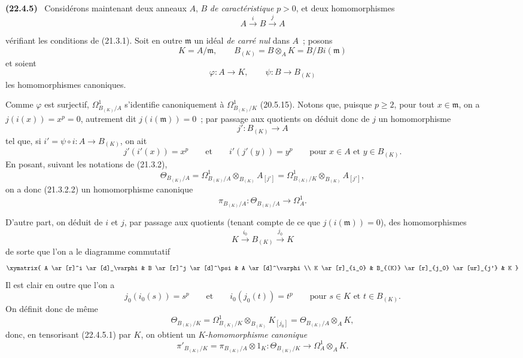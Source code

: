 \documentclass[10pt,oneside]{book}
\makeatletter
\newcommand{\setmanualcurrentlabel}[1]{\def\@currentlabel{#1}}
\newcommand{\oldpage}[2][]{%
  \setcounter{footnote}{0}%
  \marginpar{\scriptsize\textbf{#1}~|~#2}\ignorespaces}
\newenvironment{env}[1][]{\setmanualcurrentlabel{#1}\par\medskip\noindent\textbf{(#1)}\ }{\par}
\makeatother
\begin{document}
\begin{env}[22.4.5]
\label{0.22.4.5-fr}
Considérons maintenant deux anneaux $A$, $B$ \emph{de caractéristique} $p>0$, et
deux homomorphismes
\[
  A\xrightarrow{i}B\xrightarrow{j}A
\]

\oldpage[0\textsubscript{IV-1}]{197}

vérifiant les conditions de (21.3.1). Soit en outre $\mathfrak m$ un idéal
\emph{de carré nul} dans $A$~; posons
\[
  K=A/\mathfrak m,\qquad
  B_{(K)}=B\otimes_AK=B/Bi(\mathfrak m)
\]
et soient
\[
  \varphi:A\longrightarrow K,\qquad
  \psi:B\longrightarrow B_{(K)}
\]
les homomorphismes canoniques.

Comme $\varphi$ est surjectif, $\Omega^1_{B_{(K)}/A}$ s'identifie
canoniquement à $\Omega^1_{B_{(K)}/K}$ (20.5.15). Notons que, puisque
$p\geqslant2$, pour tout $x\in\mathfrak m$, on a $j(i(x))=x^p=0$, autrement
dit $j(i(\mathfrak m))=0$~; par passage aux quotients on déduit donc de $j$ un
homomorphisme
\[
  j':B_{(K)}\longrightarrow A
\]
tel que, si $i'=\psi\circ i:A\longrightarrow B_{(K)}$, on ait
\[
  j'(i'(x))=x^p\qquad\text{et}\qquad i'(j'(y))=y^p
  \qquad\text{pour }x\in A\text{ et }y\in B_{(K)}.
\]
En posant, suivant les notations de (21.3.2),
\[
  \Theta_{B_{(K)}/A}
  =\Omega^1_{B_{(K)}/A}\otimes_{B_{(K)}}A_{[j']}
  =\Omega^1_{B_{(K)}/K}\otimes_{B_{(K)}}A_{[j']},
\]
on a donc (21.3.2.2) un homomorphisme canonique
\begin{equation}
\label{0.22.4.5.1-fr}
  \pi_{B_{(K)}/A}:\Theta_{B_{(K)}/A}\longrightarrow\Omega^1_A.
  \tag{22.4.5.1}
\end{equation}

D'autre part, on déduit de $i$ et $j$, par passage aux quotients (tenant compte
de ce que $j(i(\mathfrak m))=0$), des homomorphismes
\[
  K\xrightarrow{i_0}B_{(K)}\xrightarrow{j_0}K
\]
de sorte que l'on a le diagramme commutatif
\[
  \xymatrix{
    A \ar[r]^i \ar[d]_\varphi & B \ar[r]^j \ar[d]^\psi & A \ar[d]^\varphi \\
    K \ar[r]_{i_0} & B_{(K)} \ar[r]_{j_0} \ar[ur]_{j'} & K
  }
\]
Il est clair en outre que l'on a
\[
  j_0(i_0(s))=s^p\qquad\text{et}\qquad i_0(j_0(t))=t^p
  \qquad\text{pour }s\in K\text{ et }t\in B_{(K)}.
\]
On définit donc de même
\[
  \Theta_{B_{(K)}/K}
  =\Omega^1_{B_{(K)}/K}\otimes_{B_{(K)}}K_{[j_0]}
  =\Theta_{B_{(K)}/A}\otimes_AK,
\]
donc, en tensorisant (22.4.5.1) par $K$, on obtient un
$K$-\emph{homomorphisme canonique}
\begin{equation}
\label{0.22.4.5.2-fr}
  \pi'_{B_{(K)}/K}=\pi_{B_{(K)}/A}\otimes1_K:
  \Theta_{B_{(K)}/K}\longrightarrow\Omega^1_A\otimes_AK.
  \tag{22.4.5.2}
\end{equation}


\end{env}
\end{document}
